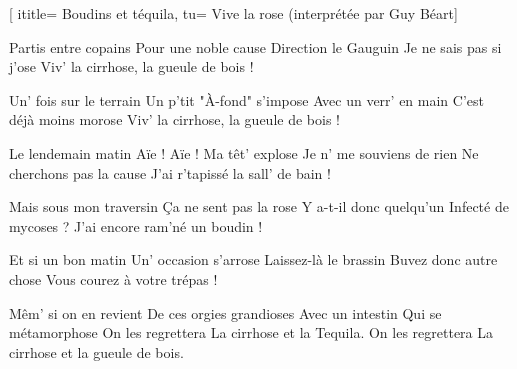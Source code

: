 [
ititle={ Boudins et téquila},
tu= {Vive la rose (interprétée par Guy Béart}]


\beginverse
Partis entre copains
Pour une noble cause
Direction le Gauguin
Je ne sais pas si j'ose
 {Viv' la cirrhose, la gueule de bois !}
\endverse

\beginverse
Un' fois sur le terrain
Un p'tit "À-fond" s'impose
Avec un verr' en main
C'est déjà moins morose
 {Viv' la cirrhose, la gueule de bois !}
\endverse

\beginverse
Le lendemain matin
Aïe ! Aïe ! Ma têt' explose
Je n' me souviens de rien
Ne cherchons pas la cause
 {J'ai r'tapissé la sall' de bain !}
\endverse

\beginverse
Mais sous mon traversin
Ça ne sent pas la rose
Y a-t-il donc quelqu'un
Infecté de mycoses ?
 {J'ai encore ram'né un boudin !}
\endverse

\beginverse
Et si un bon matin
Un' occasion s'arrose
Laissez-là le brassin
Buvez donc autre chose
 {Vous courez à votre trépas !}
\endverse

\beginverse
Mêm' si on en revient
De ces orgies grandioses
Avec un intestin
Qui se métamorphose
On les regrettera 
La cirrhose et la Tequila.
On les regrettera
La cirrhose et la gueule de bois.
\endverse

\endsong
